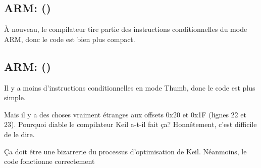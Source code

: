 ﻿\subsection{ARM: \OptimizingKeilVI (\ARMMode)}

À nouveau, le compilateur tire partie des instructions conditionnelles du mode ARM,
donc le code est bien plus compact.



\subsection{ARM: \OptimizingKeilVI (\ThumbMode)}
\myindex{\CompilerAnomaly}
\label{Keil_anomaly}

Il y a moins d'instructions conditionnelles en mode Thumb, donc le code est plus simple.

Mais il y a des choses vraiment étranges aux offsets 0x20 et 0x1F (lignes 22 et 23).
Pourquoi diable le compilateur Keil a-t-il fait ça?
Honnêtement, c'est difficile de le dire.

Ça doit être une bizarrerie du processus d'optimisation de Keil.
Néanmoins, le code fonctionne correctement




